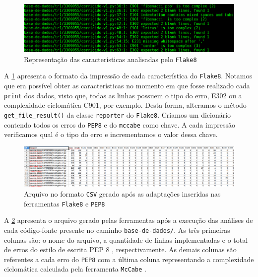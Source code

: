 			\begin{figure}[h]
				\centering
				\includegraphics[width=1\linewidth]{imagem/flake8}
				\caption{Representação das características analisadas pelo \texttt{Flake8}}
				\label{fig:flake8}
			\end{figure}
			
			A \cref{fig:flake8} apresenta o formato da impressão de cada característica do
			\texttt{Flake8}. Notamos que era possível obter as características no momento em
			que fosse realizado cada \texttt{print} dos dados, visto que, todas as linhas
			possuem o tipo do erro, E302 ou a complexidade ciclomática C901, por exemplo.
			Desta forma, alteramos o método \texttt{get\_file\_result()} da classe
			\texttt{reporter} do \texttt{Flake8}. Criamos um dicionário contendo todos os
			erros do \texttt{PEP8} e do \texttt{mccabe} como chave. A cada impressão
			verificamos qual é o tipo do erro e incrementamos o valor dessa chave.
			
			\begin{figure}[h]
				\centering
				\includegraphics[width=1\linewidth]{imagem/arquivoCSV}
				\caption{Arquivo no formato \texttt{CSV} gerado após as adaptações inseridas nas ferramentas \texttt{Flake8} e \texttt{PEP8}}
				\label{fig:arquivoCSV}
			\end{figure}
			
			A \cref{fig:arquivoCSV} apresenta o arquivo gerado pelas ferramentas após a
			execução das análises de cada código-fonte presente no caminho \texttt{base-de-dados/}.
			As três primeiras colunas são: o nome do arquivo, a quantidade de linhas implementadas
			e o total de erros do estilo de escrita PEP 8 \cite{van2001pep}, respectivamente. As
			demais colunas são referentes a cada erro do \texttt{PEP8} \cite{pep8} com a última
			coluna representando a complexidade ciclomática calculada pela ferramenta
			\texttt{McCabe} \cite{mccabe}.


